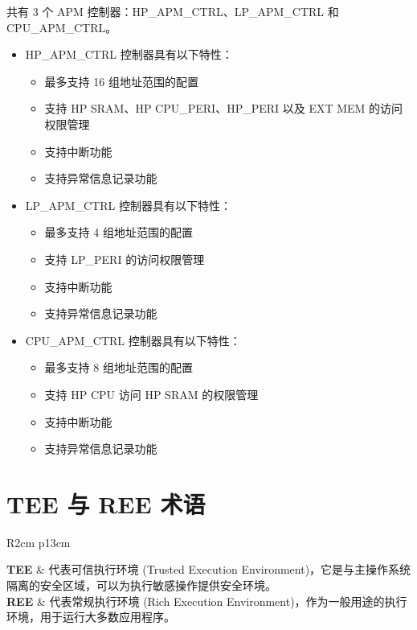 \documentclass[main\_\_CN.tex]{subfiles}
\begin{document}
\chipname{} 共有 3 个 APM 控制器：HP\_APM\_CTRL、LP\_APM\_CTRL 和 CPU\_APM\_CTRL。
\begin{itemize}
    \item HP\_APM\_CTRL 控制器具有以下特性：
        \begin{itemize}
        \item 最多支持 16 组地址范围的配置
        \item 支持 HP SRAM、HP CPU\_PERI、HP\_PERI 以及 EXT MEM 的访问权限管理
        \item 支持中断功能
        \item 支持异常信息记录功能
        \end{itemize}
    \item LP\_APM\_CTRL 控制器具有以下特性：
        \begin{itemize}
        \item 最多支持 4 组地址范围的配置
        \item 支持 LP\_PERI 的访问权限管理
        \item 支持中断功能
        \item 支持异常信息记录功能
        \end{itemize}
    \item CPU\_APM\_CTRL 控制器具有以下特性：
        \begin{itemize}
        \item 最多支持 8 组地址范围的配置
        \item 支持 HP CPU 访问 HP SRAM 的权限管理
        \item 支持中断功能
        \item 支持异常信息记录功能
        \end{itemize}
\end{itemize}

\section{TEE 与 REE 术语}

\begin{longtable}[L]{ R{2cm} p{13cm} }

\textbf{TEE} & 代表可信执行环境 (Trusted Execution Environment)，它是与主操作系统隔离的安全区域，可以为执行敏感操作提供安全环境。\\

\textbf{REE} & 代表常规执行环境 (Rich Execution Environment)，作为一般用途的执行环境，用于运行大多数应用程序。
\end{longtable}
\end{document}
